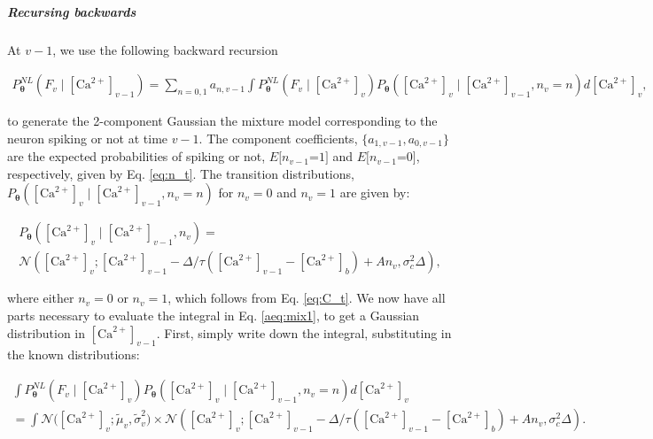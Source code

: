\documentclass[10pt]{article}
\providecommand{\ve}[1]{\boldsymbol{#1}}
\providecommand{\ve}[1]{\boldsymbol{#1}}
\newcommand{\thetn}{\ve{\theta}}
\newcommand{\p}{P_{\thetn}}
\newcommand{\Ca}{[\text{Ca}^{2+}]}
\begin{document}
%

\subparagraph{Recursing backwards}

At $v-1$, we use the following backward recursion

\begin{align} \label{aeq:mix1}
\p^{NL}(F_v \mid \Ca_{v-1}) = \sum_{n=0,1} a_{n,v-1} \int \p^{NL}(F_v \mid \Ca_v) \p(\Ca_v \mid \Ca_{v-1}, n_v=n) d\Ca_v,
\end{align}

\noindent to generate the 2-component Gaussian the mixture model corresponding to the neuron spiking or not at time $v-1$. The component coefficients, $\{a_{1,v-1},a_{0,v-1}\}$ are the expected probabilities of spiking or not, $E[n_{v-1}$=$1]$ and $E[n_{v-1}$=$0]$, respectively, given by Eq. \ref{eq:n_t}.  The transition distributions, $\p(\Ca_v \mid \Ca_{v-1}, n_v=n)$ for $n_v=0$ and $n_v=1$ are given by:

\begin{multline}
\p(\Ca_v \mid \Ca_{v-1}, n_v) =\\
\mathcal{N}(\Ca_v; \Ca_{v-1} -\Delta/\tau (\Ca_{v-1} - \Ca_b) + A n_v, \sigma_c^2 \Delta),
\end{multline}

\noindent where either $n_v=0$ or $n_v=1$, which follows from Eq. \ref{eq:C_t}. We now have all parts necessary to evaluate the integral in Eq. \ref{aeq:mix1}, to get a Gaussian distribution in $\Ca_{v-1}$.  First, simply write down the integral, substituting in the known distributions:

\begin{multline} \label{aeq:2n}
\int \p^{NL}(F_v \mid \Ca_v) \p(\Ca_v \mid \Ca_{v-1}, n_v=n) d\Ca_v
\\= \int \mathcal{N}\big(\Ca_v; \widetilde{\mu}_v, \widetilde{\sigma}_v^2\big)  \times \mathcal{N}(\Ca_v; \Ca_{v-1} -\Delta/\tau (\Ca_{v-1} - \Ca_b) + A n_v, \sigma_c^2 \Delta).
\end{multline}
\end{document}
